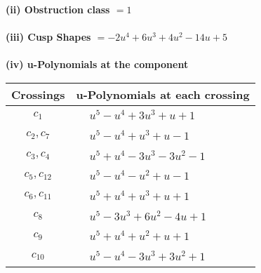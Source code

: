 \documentclass[1p]{elsarticle_modified}
\theoremstyle{definition}
\begin{document}
\flushleft \textbf{(ii) Obstruction class $= 1$}\\~\\
\flushleft \textbf{(iii) Cusp Shapes $= -2 u^4+6 u^3+4 u^2-14 u+5$}\\~\\
\newpage\renewcommand{\arraystretch}{1}
\flushleft \textbf{(iv) u-Polynomials at the component}\newline \\
\begin{tabular}{m{50pt}|m{274pt}}
Crossings & \hspace{64pt}u-Polynomials at each crossing \\
\hline $$\begin{aligned}c_{1}\end{aligned}$$&$\begin{aligned}
&u^5- u^4+3 u^3+u+1
\end{aligned}$\\
\hline $$\begin{aligned}c_{2},c_{7}\end{aligned}$$&$\begin{aligned}
&u^5- u^4+u^3+u-1
\end{aligned}$\\
\hline $$\begin{aligned}c_{3},c_{4}\end{aligned}$$&$\begin{aligned}
&u^5+u^4-3 u^3-3 u^2-1
\end{aligned}$\\
\hline $$\begin{aligned}c_{5},c_{12}\end{aligned}$$&$\begin{aligned}
&u^5- u^4- u^2+u-1
\end{aligned}$\\
\hline $$\begin{aligned}c_{6},c_{11}\end{aligned}$$&$\begin{aligned}
&u^5+u^4+u^3+u+1
\end{aligned}$\\
\hline $$\begin{aligned}c_{8}\end{aligned}$$&$\begin{aligned}
&u^5-3 u^3+6 u^2-4 u+1
\end{aligned}$\\
\hline $$\begin{aligned}c_{9}\end{aligned}$$&$\begin{aligned}
&u^5+u^4+u^2+u+1
\end{aligned}$\\
\hline $$\begin{aligned}c_{10}\end{aligned}$$&$\begin{aligned}
&u^5- u^4-3 u^3+3 u^2+1
\end{aligned}$\\
\hline
\end{tabular}\\~\\
\end{document}
